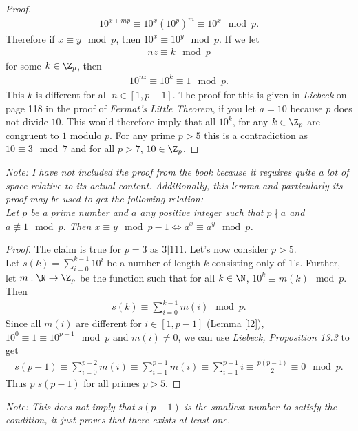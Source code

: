 \documentclass{article}
\begin{document}
\begin{adjustwidth}{2em}{2em}
\begin{proof}
\begin{align*}
      10^{x+mp}\equiv 10^{x}\left(10^{p}\right)^m\equiv 10^{x}\mod p.
    \end{align*}
    Therefore if $x\equiv y \mod p$, then $10^x\equiv 10^y\mod p$. If we let
    \begin{align*}
      nz \equiv k \mod p
    \end{align*}
    for some $k\in\Z_p$, then
    \begin{align*}
      10^{nz}\equiv 10^{k} \equiv 1 \mod p.
    \end{align*}
    This $k$ is different for all $n\in[1,p-1]$. The proof for this is given in \emph{Liebeck} on page 118 in the proof of \emph{Fermat's Little Theorem}, if you let $a=10$ because $p$ does not divide $10$. This would therefore imply that all $10^k$, for any $k\in\Z_p$ are congruent to $1$ modulo $p$. For any prime $p>5$ this is a contradiction as $10\equiv 3 \mod 7$ and for all $p>7$, $10\in\Z_p$.
  \end{proof}
  \emph{Note: I have not included the proof from the book because it requires quite a lot of space relative to its actual content.
    Additionally, this lemma and particularly its proof may be used to get the following relation:\\
    Let $p$ be a prime number and $a$ any positive integer such that $p\nmid a$ and $a\not\equiv 1 \mod p$. Then $x\equiv y \mod p-1 \Leftrightarrow a^x\equiv a^y \mod p$.}
\end{adjustwidth}
\begin{proof}
  The claim is true for $p=3$ as $3|111$. Let's now consider $p>5$.\\
  Let $s(k)=\sum_{i=0}^{k-1} 10^i$ be a number of length $k$ consisting only of $1$'s.
  Further, let $m:\N\to\Z_p$ be the function such that for all $k\in\N$, $10^k\equiv m(k)\mod p$. Then
  \begin{align*}
    s(k) \equiv \sum_{i=0}^{k-1} m(i) \mod p.
  \end{align*}
  Since all $m(i)$ are different for $i\in[1,p-1]$ (Lemma \ref{l2}), $10^0\equiv 1\equiv 10^{p-1}\mod p$ and $m(i)\not=0$, we can use \emph{Liebeck, Proposition 13.3} to get
  \begin{align*}
    s(p-1)
    \equiv \sum_{i=0}^{p-2}m(i)
    \equiv \sum_{i=1}^{p-1}m(i)
    \equiv \sum_{i=1}^{p-1} i
    \equiv \frac{p(p-1)}{2}
    \equiv 0 \mod p.
  \end{align*}
  Thus $p|s(p-1)$ for all primes $p>5$.
\end{proof}
\emph{Note: This does not imply that $s(p-1)$ is the smallest number to satisfy the condition, it just proves that there exists at least one.}
\end{document}
